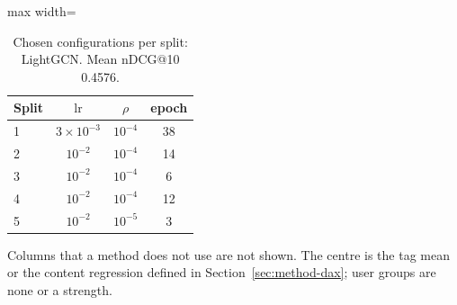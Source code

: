 \begin{table}[tbp]
\centering
\footnotesize
\caption{Chosen configurations per split: LightGCN. Mean nDCG@10 0.4576.}
\label{tab:grid06}
\begin{adjustbox}{max width=\linewidth}
\begin{tabular}{lccc}
\toprule
Split & $\mathrm{lr}$ & $\rho$ & epoch \\
\midrule
1 & $3\times10^{-3}$ & $10^{-4}$ & 38 \\
2 & $10^{-2}$ & $10^{-4}$ & 14 \\
3 & $10^{-2}$ & $10^{-4}$ & 6 \\
4 & $10^{-2}$ & $10^{-4}$ & 12 \\
5 & $10^{-2}$ & $10^{-5}$ & 3 \\
\bottomrule
\end{tabular}
\end{adjustbox}
\par\smallskip
\begin{minipage}{\linewidth}\raggedright\footnotesize Columns that a method does not use are not shown. The centre is the tag mean or the content regression defined in Section~\ref{sec:method-dax}; user groups are none or a strength.\end{minipage}
\end{table}
